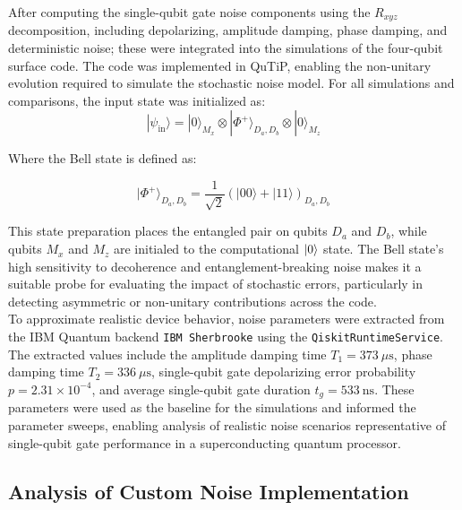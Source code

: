 \documentclass[9pt,a4paper,twocolumn,twoside]{tau-class/tau}
\begin{document}
After computing the single-qubit gate noise components using the \( R_{xyz} \) decomposition, including depolarizing, amplitude damping, phase damping, and deterministic noise; these were integrated into the simulations of the four-qubit surface code. The code was implemented in QuTiP, enabling the non-unitary evolution required to simulate the stochastic noise model.
For all simulations and comparisons, the input state was initialized as:
\begin{equation}
|\psi_{\text{in}}\rangle = |0\rangle_{M_x} \otimes |\Phi^+\rangle_{D_a, D_b} \otimes |0\rangle_{M_z}
\end{equation}

Where the Bell state is defined as:

\begin{equation}
|\Phi^+\rangle_{D_a,D_b} = \frac{1}{\sqrt{2}} \left( |00\rangle + |11\rangle \right)_{D_a,D_b}
\end{equation}

This state preparation places the entangled pair on qubits $D_a$ and $D_b$, while qubits $M_x$ and $M_z$ are initialed to the computational $\ket{0}$ state. The Bell state's high sensitivity to decoherence and entanglement-breaking noise makes it a suitable probe for evaluating the impact of stochastic errors, particularly in detecting asymmetric or non-unitary contributions across the code.\\
To approximate realistic device behavior, noise parameters were extracted from the IBM Quantum backend \texttt{IBM Sherbrooke} using the \texttt{QiskitRuntimeService}. The extracted values include the amplitude damping time \( T_1 = 373~\mu\text{s} \), phase damping time \( T_2 = 336~\mu\text{s} \), single-qubit gate depolarizing error probability \textit{\( p = 2.31 \times 10^{-4} \)}, and average single-qubit gate duration \( t_g = 533~\text{ns} \). These parameters were used as the baseline for the simulations and informed the parameter sweeps, enabling analysis of realistic noise scenarios representative of single-qubit gate performance in a superconducting quantum processor.

\subsection{Analysis of Custom Noise Implementation}
\end{document}
